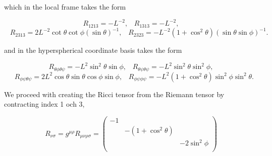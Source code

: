 which in the local frame takes the form

\begin{equation*}
R_{1213}=-L^{-2},\;\;\;R_{1313}=-L^{-2},
\end{equation*}
\begin{equation*}
\;\;\;R_{2313}=2L^{-2}\cot\theta\cot\phi(\sin\theta)^{-1},\;\;\;R_{2323}=-L^{-2}(1+\cos^2\theta)(\sin\theta\sin\phi)^{-1}.
\end{equation*}

and in the hyperspherical coordinate basis takes the form

\begin{equation*}
R_{\theta\phi\theta\psi}=-L^2\sin^2\theta\sin\phi,\;\;\;R_{\theta\psi\theta\psi}=-L^2\sin^2\theta\sin^2\phi,
\end{equation*}
\begin{equation*}
\;\;\;R_{\phi\psi\theta\psi}=2L^2\cos\theta\sin\theta\cos\phi\sin\phi,\;\;\;R_{\phi\psi\phi\psi}=-L^2(1+\cos^2\theta)\sin^2\phi\sin^2\theta.
\end{equation*}

We proceed with creating the Ricci tensor from the Riemann tensor by contracting index 1 och 3,

 \begin{equation*}
 R_{\nu\sigma}=g^{\mu\rho}R_{\mu\nu\rho\sigma}=
 \left(
 \begin{array}{ccc}
 -1 & & \\
  & -(1+\cos^2\theta) & \\
  & & -2\sin^2\phi\\
 \end{array}
 \right)
 \end{equation*}